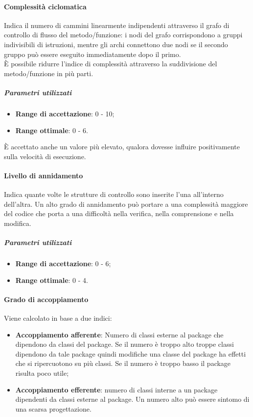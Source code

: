 \documentclass[../PianoDiQualifica.tex]{subfiles}
\begin{document}
				\paragraph{Complessità ciclomatica\\}
					Indica il numero di cammini linearmente indipendenti attraverso il
					grafo di controllo di flusso del metodo/funzione: i nodi del grafo
					corrispondono a gruppi indivisibili di istruzioni, mentre gli archi
					connettono due nodi se il secondo gruppo può essere eseguito
					immediatamente dopo il primo.\\
					È possibile ridurre l'indice di complessità attraverso la
					suddivisione del metodo/funzione in più parti.
					\subparagraph{Parametri utilizzati}
						\begin{itemize}
							\item \textbf{Range di accettazione}: 0 - 10;
							\item \textbf{Range ottimale}: 0 - 6.
						\end{itemize}
						\par È accettato anche un valore più elevato, qualora
						dovesse influire positivamente sulla velocità di esecuzione.
					
					
					\paragraph{Livello di annidamento}
					Indica quante volte le strutture di controllo sono inserite l'una all'interno dell'altra. Un alto grado di annidamento può portare a una complessità maggiore del codice che porta a una difficoltà nella verifica, nella comprensione e nella modifica.
					\subparagraph{Parametri utilizzati}
					\begin{itemize}
						\item \textbf{Range di accettazione}: 0 - 6;
						\item \textbf{Range ottimale}: 0 - 4.
					\end{itemize}
					
					\paragraph{Grado di accoppiamento}
					Viene calcolato in base a due indici:
					\begin{itemize}
						\item \textbf{Accoppiamento afferente}: Numero di classi esterne al package che dipendono da classi del package. Se il numero è troppo alto troppe classi dipendono da tale package quindi modifiche una classe del package ha effetti che si ripercuotono su più classi. Se il numero è troppo basso il package risulta poco utile;
						\item \textbf{Accoppiamento efferente}: numero di classi interne a un package dipendenti da classi esterne al package. Un numero alto può essere sintomo di una scarsa progettazione.
					\end{itemize}
					
\end{document}
